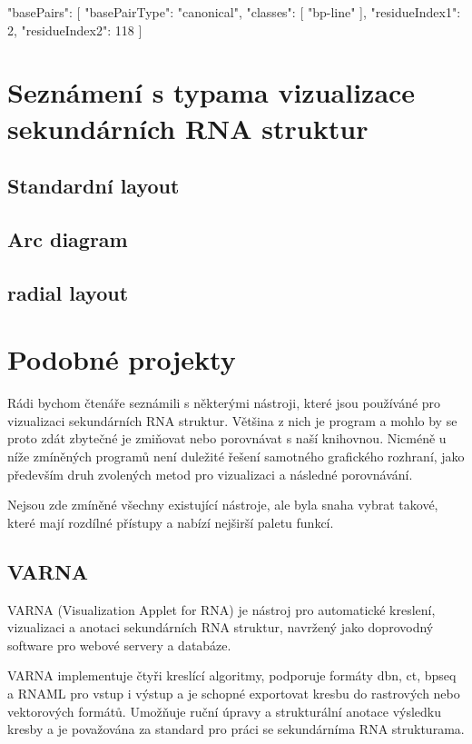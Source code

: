 \begin{code}
  { 
    "basePairs": [
      {
        "basePairType": "canonical",
        "classes": [
          "bp-line"
        ],
        "residueIndex1": 2,
        "residueIndex2": 118
      }
    ]    
  }
\end{code}

\section{Seznámení s typama vizualizace sekundárních RNA struktur}

\subsection{Standardní layout}

\subsection {Arc diagram}

\subsection {radial layout}

\section{Podobné projekty}
Rádi bychom čtenáře seznámili s některými nástroji, které jsou používáné pro
vizualizaci sekundárních RNA struktur. Většina z nich je program a mohlo by se
proto zdát zbytečné je zmiňovat nebo porovnávat s naší knihovnou. Nicméně u
níže zmíněných programů není duležité řešení samotného grafického rozhraní,
jako především druh zvolených metod pro vizualizaci a následné porovnávání.

Nejsou zde zmíněné všechny existující nástroje, ale byla snaha vybrat takové,
které mají rozdílné přístupy a nabízí nejširší paletu funkcí.

\subsection{VARNA}
  VARNA\cite{Varna} (Visualization Applet for RNA) je nástroj pro automatické kreslení,
  vizualizaci a anotaci sekundárních RNA struktur, navržený jako doprovodný
  software pro webové servery a databáze.

  VARNA implementuje čtyři kreslící algoritmy, podporuje formáty dbn, ct,
  bpseq a RNAML pro vstup i výstup a je schopné exportovat kresbu do rastrových
  nebo vektorových formátů. Umožňuje ruční úpravy a strukturální anotace
  výsledku kresby a je považována za standard pro práci se sekundárníma RNA
  strukturama.

